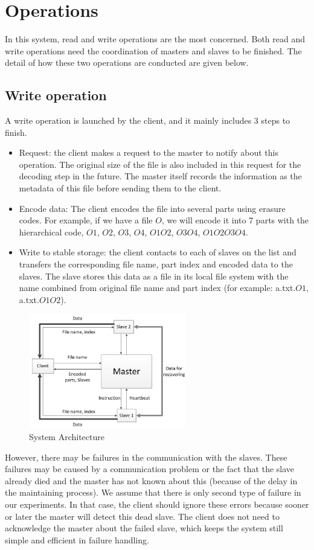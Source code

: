 \documentclass[conference]{IEEEtran}
\begin{document}
\section{Operations}
In this system, read and write operations are the most concerned. Both read and write operations need the coordination of masters and slaves to be finished. The detail of how these two operations are conducted are given below.
\subsection{Write operation}
A write operation is launched by the client, and it mainly includes 3 steps to finish.
\begin{itemize}
\item Request: the client makes a request to the master to notify about this operation. The original size of the file is also included in this request for the decoding step in the future. The master itself records the information as the  metadata  of this file before sending them to the client.
\item Encode data: The client encodes the file into several parts using erasure codes. For example, if we have a file $O$, we will encode it into 7 parts with the hierarchical code, $O1$, $O2$, $O3$, $O4$, $O1O2$, $O3O4$, $O1O2O3O4$.
\item  Write to stable storage: the client contacts to each of slaves on the list and transfers the corresponding file name, part index and encoded data to the slaves. The slave stores this data as a file in its local file system with the name combined from original file name and part index (for example: a.txt.$O1$, a.txt.$O1O2$).
\end{itemize}


\begin{figure}
	\centering
		\includegraphics[height=50mm]{a.jpg}
		\caption{System Architecture}
	\label{fig:a}
\end{figure}

However, there may be failures in the communication with the slaves. These failures may be caused by a communication problem or the fact that the slave already died and the master has not known about this (because of the delay in the maintaining process). We assume that there is only second type of failure in our experiments. In that case, the client should ignore these errors because sooner or later the master will detect this dead slave. The client does not need to acknowledge the master about the failed slave, which keeps the system still simple and efficient in failure handling.
\end{document}
